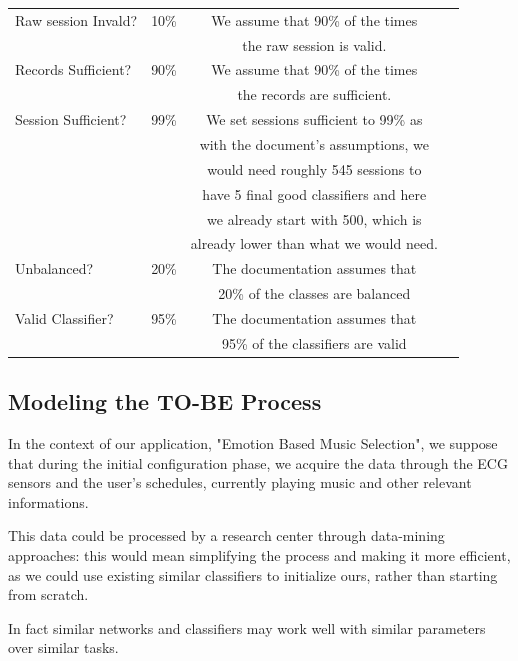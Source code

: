 \begin{table}[H]
\begin{tabularx}{\textwidth}{|X|c|c|c|}
    \hline
    Raw session Invald? & 10\% & We assume that 90\% of the times
    \\ & & the raw session is valid.\\
    \hline
    Records Sufficient? & 90\% & We assume that 90\% of the times
    \\ & & the records are sufficient.\\
    \hline
    Session Sufficient? & 99\% & We set sessions sufficient to 99\% as
    \\ & & with the document's assumptions, we 
    \\ & & would need roughly 545 sessions to 
    \\ & & have 5 final good classifiers and here
    \\ & &  we already start with 500, which is
    \\ & & already lower than what we would need.\\
    \hline
    Unbalanced? & 20\% & The documentation assumes that
    \\ & &  20\% of the classes are balanced\\
    \hline
    Valid Classifier? & 95\% & The documentation assumes that
    \\ & &  95\% of the classifiers are valid\\
    \hline

\end{tabularx}
\end{table}


\subsection{Modeling the TO-BE Process}
\label{sec:modeling_to_be_processing}

In the context of our application, "Emotion Based Music Selection", we suppose that during the initial configuration phase, we acquire the data through the ECG sensors and the user's schedules, currently playing music and other relevant informations.

This data could be processed by a research center through data-mining approaches: this would mean simplifying the process and making it more efficient, as we could use existing similar classifiers to initialize ours, rather than starting from scratch.

In fact similar networks and classifiers may work well with similar parameters over similar tasks.


